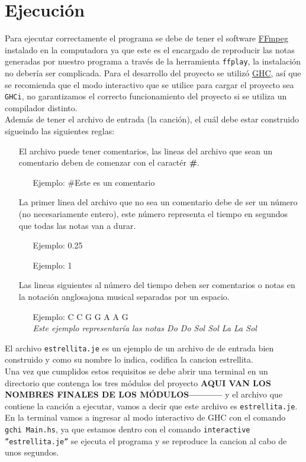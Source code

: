 \documentclass[10pt,a4paper]{article}
\begin{document}
\section{Ejecución}
\noindent Para ejecutar correctamente el programa se debe de tener el software \href{https://ffmpeg.org/}{FFmpeg} instalado en la computadora ya que este es el encargado de reproducir las notas generadas por nuestro programa a través de la herramienta \texttt{ffplay}, la instalación no debería ser complicada. Para el desarrollo del proyecto se utilizó \href{https://www.haskell.org/ghc/}{GHC}, así que se recomienda que el modo interactivo que se utilice para cargar el proyecto sea \texttt{GHCi}, no garantizamos el correcto funcionamiento del proyecto si se utiliza un compilador distinto.\\
Además de tener el archivo de entrada (la canción), el cuál debe estar construido sigueindo las siguientes reglas:
\begin{itemize}
\item[\textbullet] El archivo puede tener comentarios, las lineas del archivo que sean un comentario deben de comenzar con el caractér \textbf{\#}.
	\begin{itemize}
		\item [Ejemplo:] \#Este es un comentario
	\end{itemize}
\item[\textbullet] La primer linea del archivo que no sea un comentario debe de ser un número (no necesariamente entero), este número  representa el tiempo en segundos que todas las notas van a durar.
	\begin{itemize}
		\item [Ejemplo:] 0.25
		\item [Ejemplo:] 1
	\end{itemize}
\item[\textbullet] Las lineas siguientes al número del tiempo deben ser comentarios o notas en la notación anglosajona musical separadas por un espacio.
	\begin{itemize}
		\item [Ejemplo:] C C G G A A G\\
		\textit{Este ejemplo representaría las notas Do Do Sol Sol La La Sol}
	\end{itemize}
\end{itemize}
El archivo \texttt{estrellita.je} es un ejemplo de un archivo de de entrada bien construido y como su nombre lo indica, codifica la cancion estrellita.\\
Una vez que cumplidos estos requisitos se debe abrir una terminal en un directorio que contenga los tres módulos del proyecto \textbf{AQUI VAN LOS NOMBRES FINALES DE LOS MÓDULOS-----------} y el archivo que contiene la canción a ejecutar, vamos a decir que este archivo es \texttt{estrellita.je}.
\\ En la terminal vamos a ingresar al modo interactivo de GHC con el comando \texttt{gchi Main.hs}, ya que estamos dentro con el comando \texttt{interactive ''estrellita.je''} se ejecuta el programa y se reproduce la cancion al cabo de unos segundos.\\
\end{document}
